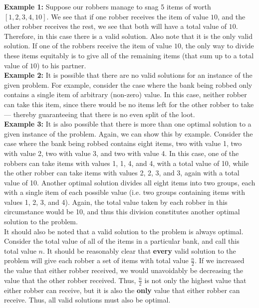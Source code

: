 \documentclass{article}
\begin{document}
\textbf{Example 1:}  Suppose our robbers manage to snag 5 items of worth $[1,2,3,4,10]$.  We see that if one robber receives the item of value $10$, and the other robber receives the rest, we see that both will have a total value of $10$.  Therefore, in this case there is a valid solution.  Also note that it is the only valid solution. If one of the robbers receive the item of value $10$, the only way to divide these items equitably is to give all of the remaining items (that sum up to a total value of $10$) to his partner. \\

\textbf{Example 2:}  It is possible that there are no valid solutions for an instance of the given problem. For example, consider the case where the bank being robbed only contains a single item of arbitrary (non-zero) value. In this case, neither robber can take this item, since there would be no items left for the other robber to take --- thereby guaranteeing that there is no even split of the loot.  \\

\textbf{Example 3:} It is also possible that there is more than one optimal solution to a given instance of the problem. Again, we can show this by example. Consider the case where the bank being robbed contains eight items, two with value 1, two with value 2, two with value 3, and two with value 4. In this case, one of the robbers can take items with values 1, 1, 4, and 4, with a total value of 10, while the other robber can take items with values 2, 2, 3, and 3, again with a total value of 10. Another optimal solution divides all eight items into two groups, each with a single item of each possible value (i.e. two groups containing items with values 1, 2, 3, and 4). Again, the total value taken by each robber in this circumstance would be 10, and thus this division constitutes another optimal solution to the problem. \\

It should also be noted that a valid solution to the problem is always optimal. Consider the total value of all of the items in a particular bank, and call this total value $n$. It should be reasonably clear that \textbf{every} valid solution to the problem will give each robber a set of items with total value $\frac{n}{2}$. If we increased the value that either robber received, we would unavoidably be decreasing the value that the other robber received. Thus, $\frac{n}{2}$ is not only the highest value that either robber can receive, but it is also the \textbf{only} value that either robber can receive. Thus, all valid solutions must also be optimal.
\end{document}
